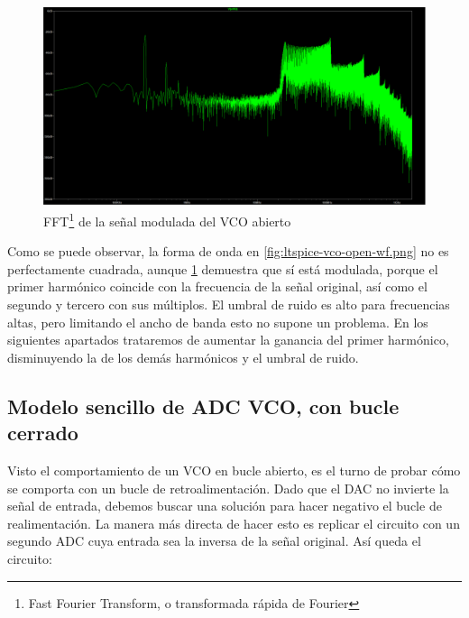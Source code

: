 \documentclass[12pt]{report} %
\begin{document}
	\begin{figure}[H]
		\includegraphics[width=\textwidth]{ltspice-vco-open-wf-fft.png}
		\caption[FFT de la señal modulada del VCO abierto]{FFT\footnote{Fast Fourier Transform, o transformada rápida de Fourier} de la señal modulada del VCO abierto}
		\label{fig:ltspice-vco-open-wf-fft.png}
	\end{figure}

	Como se puede observar, la forma de onda en \ref{fig:ltspice-vco-open-wf.png} no es perfectamente cuadrada, aunque \ref{fig:ltspice-vco-open-wf-fft.png} demuestra que sí está modulada, porque el primer harmónico coincide %
	con la frecuencia de la señal original, así como el segundo y tercero con sus múltiplos. El umbral de ruido es alto para frecuencias altas, pero limitando el ancho de banda esto no supone un problema. En los siguientes apartados trataremos de aumentar la ganancia del primer harmónico, disminuyendo la de los demás harmónicos y el umbral de ruido.
	
	\subsection{Modelo sencillo de ADC VCO, con bucle cerrado}
	
	Visto el comportamiento de un VCO en bucle abierto, es el turno de probar cómo se comporta con un bucle de retroalimentación. Dado que el DAC no invierte la señal de entrada, debemos buscar una solución para hacer negativo el bucle de realimentación. La manera más directa de hacer esto es replicar el circuito con un segundo ADC cuya entrada sea la inversa de la señal original. Así queda el circuito:
	
\end{document}
